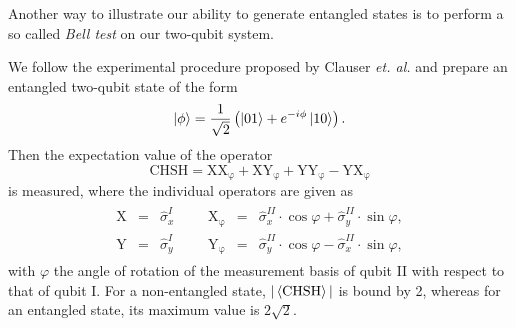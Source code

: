 Another way to illustrate our ability to generate entangled states is to perform a so called {\it Bell test}  \citep{einstein_can_1935,bell_einstein_1964}  on our two-qubit system.

\smallskip

We follow the experimental procedure proposed by Clauser {\it et. al.} \citep{clauser_proposed_1969,freedman_experimental_1972,aspect_experimental_1982} and prepare an entangled two-qubit state of the form
%
\begin{equation}
\left| \phi \right> = \frac{1}{\sqrt{2}}\left(\left| 01 \right>+e^{-i\phi}\left| 10 \right>\right). \label{eq:chsh_state}
\end{equation}
%
Then the expectation value of the operator
%
\begin{equation}
\mathrm{CHSH} = \mathrm{XX_{\varphi}}+\mathrm{XY_{\varphi}}+\mathrm{YY_{\varphi}}-\mathrm{YX_{\varphi}}
\end{equation}
%
is measured, where the individual operators are given as
%
\begin{eqnarray}
	\begin{array}{cccccccc}
		\mathrm{X} & = & \hat{\sigma}_x^I  &&& \mathrm{X_{\varphi}} & = & \hat{\sigma}_x^{II}\cdot \cos{\varphi}+\hat{\sigma}_y^{II} \cdot \sin{\varphi}, \\
		\mathrm{Y} & = & \hat{\sigma}_y^I&&& \mathrm{Y_{\varphi}} & = & \hat{\sigma}_y^{II}\cdot \cos{\varphi}-\hat{\sigma}_x^{II} \cdot \sin{\varphi},
	\end{array}
\end{eqnarray} 
%
with $\varphi$ the angle of rotation of the measurement basis of qubit II with respect to that of qubit I. For a non-entangled state, $|\left< \mathrm{CHSH} \right>|$  is bound by 2, whereas for an entangled state, its maximum value is $2\sqrt{2}$. 

\smallskip

